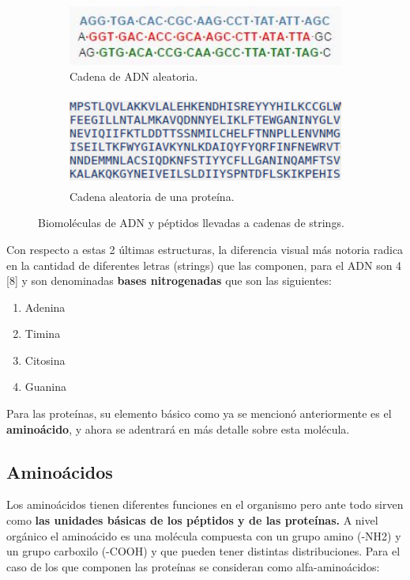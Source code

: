\begin{figure}[H]

\begin{subfigure}{0.5\textwidth}
\includegraphics[width=1\linewidth, height=2cm]{./images/adnejemplo}
\caption{Cadena de ADN aleatoria.}
\label{fig:subim4}
\end{subfigure}
\begin{subfigure}{0.4\textwidth}
\includegraphics[width=1\linewidth, height=3cm]{./images/cadenaproteina} 
\caption{Cadena aleatoria de una proteína.}
\label{fig:subim3}
\end{subfigure}
 
\caption{Biomoléculas de ADN y péptidos llevadas a cadenas de strings.}
\label{fig:image2}
\end{figure}

Con respecto a estas 2 últimas estructuras, la diferencia visual más notoria radica en la cantidad de diferentes letras (strings) que las componen, para el ADN son 4 [8] y son denominadas \textbf{bases nitrogenadas} que son las siguientes:

\begin{enumerate}
\item Adenina
\item Timina
\item Citosina
\item Guanina
\end{enumerate}

Para las proteínas, su elemento básico como ya se mencionó anteriormente es el \textbf{aminoácido}, y ahora se adentrará en más detalle sobre esta molécula.

\subsection{Aminoácidos}

Los aminoácidos tienen diferentes funciones en el organismo \cite{amino} pero ante todo sirven como \textbf{las unidades básicas de los péptidos y de las proteínas.} A nivel orgánico el aminoácido es una molécula compuesta con un grupo amino (-NH2) y un grupo carboxilo (-COOH) y que pueden tener distintas distribuciones. Para el caso de los que componen las proteínas se consideran como alfa-aminoácidos:


